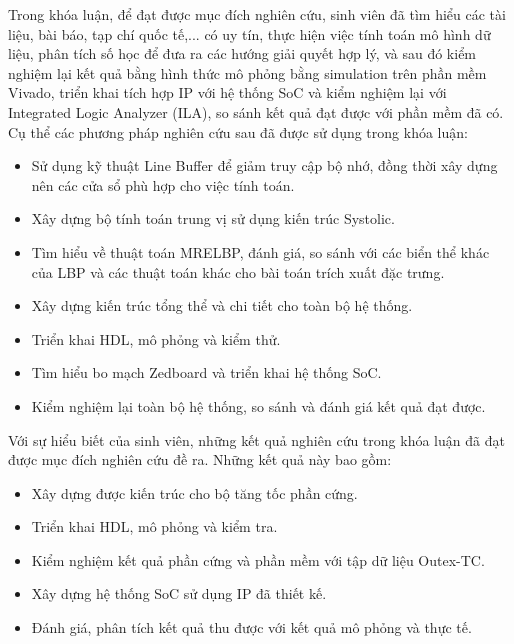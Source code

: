 \vspace{0.3cm}

Trong khóa luận, để đạt được mục đích nghiên cứu, sinh viên đã tìm
hiểu các tài liệu, bài báo, tạp chí quốc tế,... có uy tín, thực hiện việc tính toán mô hình dữ liệu, phân tích số học để đưa ra các hướng giải quyết hợp lý, và sau đó kiểm nghiệm lại kết quả bằng hình thức mô phỏng bằng simulation trên phần mềm Vivado, triển khai tích hợp IP với hệ thống SoC và kiểm nghiệm lại với Integrated Logic Analyzer (ILA), so sánh kết quả đạt được với phần mềm đã có.  Cụ thể các phương pháp nghiên cứu sau đã được sử dụng trong khóa luận:
\renewcommand{\labelitemi}{$-$}
\begin{itemize}
	\item Sử dụng kỹ thuật Line Buffer để giảm truy cập bộ nhớ, đồng thời xây dựng nên các cửa sổ phù hợp cho việc tính toán.
	\item Xây dựng bộ tính toán trung vị sử dụng kiến trúc Systolic.
\end{itemize} 
\renewcommand{\labelitemi}{$-$}
\begin{itemize}
	\item Tìm hiểu về thuật toán MRELBP, đánh giá, so sánh với các biển thể khác của LBP và các thuật toán khác cho bài toán trích xuất đặc trưng.
	\item Xây dựng kiến trúc tổng thể và chi tiết cho toàn bộ hệ thống.
	\item Triển khai HDL, mô phỏng và kiểm thử.
	\item Tìm hiểu bo mạch Zedboard và triển khai hệ thống SoC.
	\item Kiểm nghiệm lại toàn bộ hệ thống, so sánh và đánh giá kết quả đạt được.
\end{itemize} 
\vspace{0.3cm}

Với sự hiểu biết của sinh viên, những kết quả nghiên cứu trong khóa luận đã đạt được mục đích nghiên cứu đề ra. Những kết quả này bao gồm:

\renewcommand{\labelitemi}{$-$}
\begin{itemize}
	\item Xây dựng được kiến trúc cho bộ tăng tốc phần cứng.
	\item Triển khai HDL, mô phỏng và kiểm tra.
	\item Kiểm nghiệm kết quả phần cứng và phần mềm với tập dữ liệu Outex-TC.
	\item Xây dựng hệ thống SoC sử dụng IP đã thiết kế.
	\item Đánh giá, phân tích kết quả thu được với kết quả mô phỏng và thực tế.
\end{itemize} 

